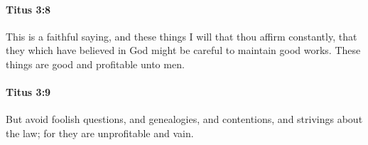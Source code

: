 		\paragraph{Titus 3:8} %
			\label{TITUS-3-8}

			This is a faithful saying, and these things I will that thou affirm constantly, that they which have believed in God might be careful to maintain good works.  These things are good and profitable unto men.

			\begin{framed}
			\scriptsize
				\begin{compactdesc}
					\item[SBLG] 
				\end{compactdesc}
			\end{framed}

		\paragraph{Titus 3:9} %
			\label{TITUS-3-9}

			But avoid foolish questions, and genealogies, and contentions, and strivings about the law; for they are unprofitable and vain.


